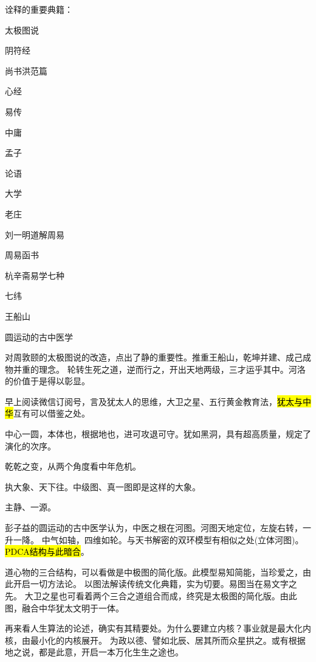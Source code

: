 诠释的重要典籍：
\begin{enumbox}
\item *
\item 太极图说
\item 阴符经
\item 尚书洪范篇
\item 心经
\item *
\item 易传
\item 中庸
\item 孟子
\item 论语
\item 大学
\item 老庄
\item *
\item 刘一明道解周易
\item 周易函书
\item 杭辛斋易学七种
\item 七纬
\item 王船山
\item *
\item 圆运动的古中医学
\end{enumbox}

对周敦颐的太极图说的改造，点出了静的重要性。推重王船山，乾坤并建、成己成物并重的理念。
轮转生死之道，逆而行之，开出天地两级，三才运乎其中。河洛的价值于是得以彰显。

早上阅读微信订阅号，言及犹太人的思维，大卫之星、五行黄金教育法，\hl{犹太与中华}互有可以借鉴之处。

中心一圆，本体也，根据地也，进可攻退可守。犹如黑洞，具有超高质量，规定了演化的次序。

乾乾之变，从两个角度看中年危机。

执大象、天下往。中级图、真一图即是这样的大象。

主静、一源。

彭子益的圆运动的古中医学认为，中医之根在河图。河图天地定位，左旋右转，一升一降。
中气如轴，四维如轮。与天书解密的双环模型有相似之处(立体河图)。\hl{PDCA结构与此暗合}。

道心物的三合结构，可以看做是中极图的简化版。此模型易知简能，当珍爱之，由此开启一切方法论。
以图法解读传统文化典籍，实为切要。易图当在易文字之先。
大卫之星也可看着两个三合之道组合而成，终究是太极图的简化版。由此图，融合中华犹太文明于一体。

再来看人生算法的论述，确实有其精要处。为什么要建立内核？事业就是最大化内核，由最小化的内核展开。
为政以德、譬如北辰、居其所而众星拱之。或有根据地之说，都是此意，开启一本万化生生之途也。

